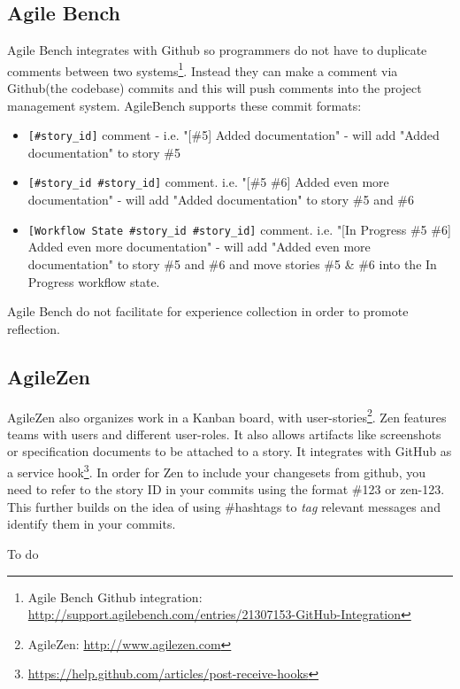 \subsection*{Agile Bench}
Agile Bench integrates with Github so programmers do not have to duplicate comments between two systems\footnote{Agile Bench Github integration: \url{http://support.agilebench.com/entries/21307153-GitHub-Integration}}. Instead they can make a comment via Github(the codebase) commits and this will push comments into the project management system. AgileBench supports these commit formats:
\begin{itemize}
\item \verb|[#story_id]| comment - i.e. "[\#5] Added documentation" - will add "Added documentation" to story \#5
\item \verb|[#story_id #story_id]| comment. i.e. "[\#5 \#6] Added even more documentation" - will add "Added documentation" to story \#5 and \#6
\item \verb|[Workflow State #story_id #story_id]| comment. i.e. "[In Progress \#5 \#6] Added even more documentation" - will add "Added even more documentation" to story \#5 and \#6 and move stories \#5 \& \#6 into the In Progress workflow state.
\end{itemize}
Agile Bench do not facilitate for experience collection in order to promote reflection.
\subsection*{AgileZen}
AgileZen also organizes work in a Kanban board, with user-stories\footnote{AgileZen: \url{http://www.agilezen.com}}. Zen features teams with users and different user-roles. It also allows artifacts like screenshots or specification documents to be attached to a story. It integrates with GitHub as a service hook\footnote{\url{https://help.github.com/articles/post-receive-hooks}}. In order for Zen to include your changesets from github, you need to refer to the story ID in your commits using the format \#123 or zen-123. This further builds on the idea of using \#hashtags to \textit{tag} relevant messages and identify them in your commits. 

To do
